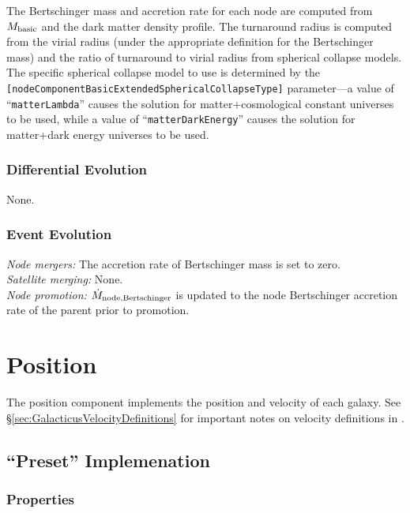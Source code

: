 The Bertschinger mass and accretion rate for each node are computed from $M_{\rm basic}$ and the dark matter density profile. The turnaround radius is computed from the virial radius (under the appropriate definition for the Bertschinger mass) and the ratio of turnaround to virial radius from spherical collapse models. The specific spherical collapse model to use is determined by the {\tt [nodeComponentBasicExtendedSphericalCollapseType]} parameter---a value of ``{\tt matterLambda}'' causes the solution for matter+cosmological constant universes to be used, while a value of ``{\tt matterDarkEnergy}'' causes the solution for matter+dark energy universes to be used.

\subsubsection{Differential Evolution}

None.

\subsubsection{Event Evolution}

\noindent\emph{Node mergers:} The accretion rate of Bertschinger mass is set to zero.\\

\noindent\emph{Satellite merging:} None.\\

\noindent\emph{Node promotion:} $\dot{M}_{\rm node, Bertschinger}$ is updated to the \gls{node} Bertschinger accretion rate of the parent prior to promotion.\\

\section{Position}\label{sec:ComponentPosition}

The position \gls{component} implements the position and velocity of each galaxy. See \S\ref{sec:GalacticusVelocityDefinitions} for important notes on velocity definitions in \glc.

\subsection{``Preset'' Implemenation}

\subsubsection{Properties}

